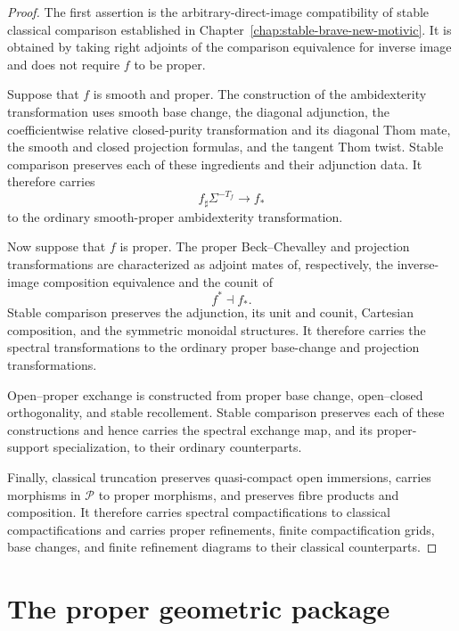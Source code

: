 \begin{proof}
The first assertion is the arbitrary-direct-image compatibility of stable
classical comparison established in
Chapter~\ref{chap:stable-brave-new-motivic}.  It is obtained by taking right
adjoints of the comparison equivalence for inverse image and does not require
\(f\) to be proper.

Suppose that \(f\) is smooth and proper.  The construction of the
ambidexterity transformation uses smooth base change, the diagonal
adjunction, the coefficientwise relative closed-purity transformation and
its diagonal Thom mate, the smooth and closed projection formulas, and the
tangent Thom twist.  Stable comparison preserves each of
these ingredients and their adjunction data.  It therefore carries
\[
    f_\sharp\Sigma^{-T_f}
    \longrightarrow
    f_*
\]
to the ordinary smooth-proper ambidexterity transformation.

Now suppose that \(f\) is proper.  The proper Beck--Chevalley and projection
transformations are characterized as adjoint mates of, respectively, the
inverse-image composition equivalence and the counit of
\[
    f^*\dashv f_*.
\]
Stable comparison preserves the adjunction, its unit and counit, Cartesian
composition, and the symmetric monoidal structures.  It therefore carries
the spectral transformations to the ordinary proper base-change and
projection transformations.

Open--proper exchange is constructed from proper base change,
open--closed orthogonality, and stable recollement.  Stable comparison
preserves each of these constructions and hence carries the spectral exchange
map, and its proper-support specialization, to their ordinary counterparts.

Finally, classical truncation preserves quasi-compact open immersions,
carries morphisms in \(\mathcal P\) to proper morphisms, and preserves fibre
products and composition.  It therefore carries spectral compactifications
to classical compactifications and carries proper refinements, finite
compactification grids, base changes, and finite refinement diagrams to
their classical counterparts.
\end{proof}

\section{The proper geometric package}
\label{sec:proper-geometric-package}

